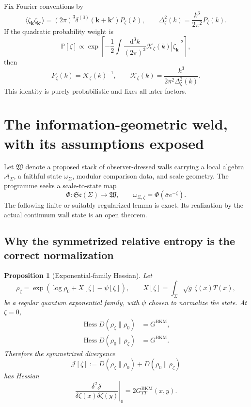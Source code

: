\documentclass[11pt]{article}
\numberwithin{equation}{section}
\newcommand{\dd}{\mathrm d}
\newcommand{\BKM}{\mathrm{BKM}}
\newcommand{\Sc}{\mathfrak{Sc}}
\newcommand{\Wall}{\mathfrak W}
\newcommand{\Kz}{\mathcal K_\zeta}
\newtheorem{proposition}[theorem]{Proposition}
\theoremstyle{definition}
\theoremstyle{remark}
\begin{document}
Fix Fourier conventions by
\begin{equation}
\langle\zeta_{\bm k}\zeta_{\bm k'}\rangle
=(2\pi)^3\delta^{(3)}(\bm k+\bm k')P_\zeta(k),
\qquad
\Delta_\zeta^2(k)=\frac{k^3}{2\pi^2}P_\zeta(k).
\end{equation}
If the quadratic probability weight is
\begin{equation}
\mathbb P[\zeta]\propto
\exp\!\left[-\frac12\int\frac{\dd^3k}{(2\pi)^3}
\Kz(k)|\zeta_{\bm k}|^2\right],
\end{equation}
then
\begin{equation}
P_\zeta(k)=\Kz(k)^{-1},
\qquad
\boxed{\Kz(k)=\frac{k^3}{2\pi^2\Delta_\zeta^2(k)}.}
\label{eq:precision-definition}
\end{equation}
This identity is purely probabilistic and fixes all later factors.

\section{The information-geometric weld, with its assumptions exposed}
\label{sec:weld}

Let $\Wall$ denote a proposed stack of observer-dressed walls carrying a local algebra $\mathcal A_\Sigma$, a faithful state $\omega_\Sigma$, modular comparison data, and scale geometry. The programme seeks a scale-to-state map
\begin{equation}
\Phi:\Sc(\Sigma)\longrightarrow\Wall,
\qquad
\omega_{\Sigma,\zeta}=\Phi(\bar\sigma e^{-\zeta}).
\end{equation}
The following finite or suitably regularized lemma is exact. Its realization by the actual continuum wall state is an open theorem.

\subsection{Why the symmetrized relative entropy is the correct normalization}

\begin{proposition}[Exponential-family Hessian]
Let
\begin{equation}
\rho_\zeta
=\exp\!\left(\log\rho_0+X[\zeta]-\psi[\zeta]\right),
\qquad
X[\zeta]=\int_\Sigma\sqrt g\,\zeta(x)T(x),
\end{equation}
be a regular quantum exponential family, with $\psi$ chosen to normalize the state. At $\zeta=0$,
\begin{align}
\operatorname{Hess}D(\rho_\zeta\|\rho_0)&=G^{\BKM},\\
\operatorname{Hess}D(\rho_0\|\rho_\zeta)&=G^{\BKM}.
\end{align}
Therefore the symmetrized divergence
\begin{equation}
\mathscr J[\zeta]
:=D(\rho_\zeta\|\rho_0)+D(\rho_0\|\rho_\zeta)
\end{equation}
has Hessian
\begin{equation}
\boxed{
\left.\frac{\delta^2\mathscr J}{\delta\zeta(x)\delta\zeta(y)}\right|_0
=2G^{\BKM}_{TT}(x,y).}
\label{eq:sym-bkm}
\end{equation}
\end{proposition}
\end{document}
